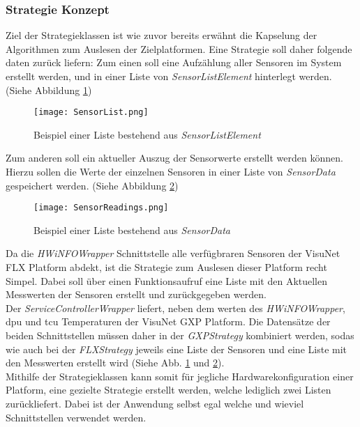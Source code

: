 \subsubsection*{Strategie Konzept}
Ziel der Strategieklassen ist wie zuvor bereits erwähnt die Kapselung der Algorithmen zum Auslesen der Zielplatformen. Eine Strategie soll daher folgende daten zurück liefern: Zum einen soll eine Aufzählung aller Sensoren im System erstellt werden, und in einer Liste von \textit{SensorListElement} hinterlegt werden. (Siehe Abbildung \ref{fig:SensorList}) 
\begin{center}
    \begin{figure}[h!]
        \centering
        \texttt{[image: SensorList.png]}
        \caption{Beispiel einer Liste bestehend aus \textit{SensorListElement}}
        \label{fig:SensorList}
    \end{figure}
\end{center}
\vspace{-1.8cm}
Zum anderen soll ein aktueller Auszug der Sensorwerte erstellt werden können. Hierzu sollen die Werte der einzelnen Sensoren in einer Liste von \textit{SensorData} gespeichert werden. (Siehe Abbildung \ref{fig:SensorReadings})
\begin{center}
    \begin{figure}[h!]
        \centering
        \texttt{[image: SensorReadings.png]}
        \caption{Beispiel einer Liste bestehend aus \textit{SensorData}}
        \label{fig:SensorReadings}
    \end{figure}
\end{center}
\vspace{-1.8cm}
Da die \textit{HWiNFOWrapper} Schnittstelle alle verfügbraren Sensoren der VisuNet FLX Platform abdekt, ist die Strategie zum Auslesen dieser Platform recht Simpel. Dabei soll über einen Funktionsaufruf eine Liste mit den Aktuellen Messwerten der Sensoren erstellt und zurückgegeben werden.\\
Der \textit{ServiceControllerWrapper} liefert, neben dem werten des \textit{HWiNFOWrapper}, \ac{dpu} und \ac{tcu} Temperaturen der VisuNet GXP Platform. Die Datensätze der beiden Schnittstellen müssen daher in der \textit{GXPStrategy} kombiniert werden, sodas wie auch bei der \textit{FLXStrategy} jeweils eine Liste der Sensoren und eine Liste mit den Messwerten erstellt wird (Siehe Abb. \ref{fig:SensorList} und \ref{fig:SensorReadings}).\\
Mithilfe der Strategieklassen kann somit für jegliche Hardwarekonfiguration einer Platform, eine gezielte Strategie erstellt werden, welche lediglich zwei Listen zurückliefert. Dabei ist der Anwendung selbst egal welche und wieviel Schnittstellen verwendet werden.

